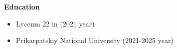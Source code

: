 {\vspace{1cm} \hspace{-1cm} \Large \textbf{Education}}

\begin{itemize}
    \item Lyceum 22 in (2021 year)
    \item Prikarpatskiy National University (2021-2025 year)
\end{itemize}